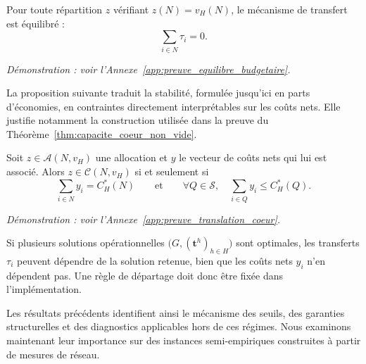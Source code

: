 \begin{proposition}
\label{prop:equilibre_budgetaire}
Pour toute répartition $z$ vérifiant \(z(N)=v_H(N)\), le mécanisme de
transfert est équilibré :
\[
    \sum_{i\in N}\tau_i=0.
\]
\end{proposition}

\emph{Démonstration : voir l'Annexe~\ref{app:preuve_equilibre_budgetaire}.}

La proposition suivante traduit la stabilité, formulée jusqu'ici en parts
d'économies, en contraintes directement interprétables sur les coûts nets. Elle
justifie notamment la construction utilisée dans la preuve du
Théorème~\ref{thm:capacite_coeur_non_vide}.

\begin{proposition}
\label{prop:translation_coeur}
Soit $z\in\mathcal A(N,v_H)$ une allocation et $y$ le vecteur de coûts
nets qui lui est associé. Alors \(z\in\mathcal C(N,v_H)\) si et seulement si
\[
    \sum_{i\in N}y_i=C_H^*(N)
    \qquad\text{et}\qquad
    \forall Q\in\mathcal S,\quad
    \sum_{i\in Q}y_i\leqslant C_H^*(Q).
\]
\end{proposition}

\emph{Démonstration : voir l'Annexe~\ref{app:preuve_translation_coeur}.}

Si plusieurs solutions opérationnelles
\(\bigl(G,(\mathbf t^h)_{h\in H}\bigr)\) sont optimales, les transferts
\(\tau_i\) peuvent dépendre de la solution retenue, bien que les coûts nets
\(y_i\) n'en dépendent pas. Une règle de départage doit donc être fixée dans
l'implémentation.

Les résultats précédents identifient ainsi le mécanisme des seuils, des
garanties structurelles et des diagnostics applicables hors de ces régimes.
Nous examinons maintenant leur importance sur des instances semi-empiriques
construites à partir de mesures de réseau.
